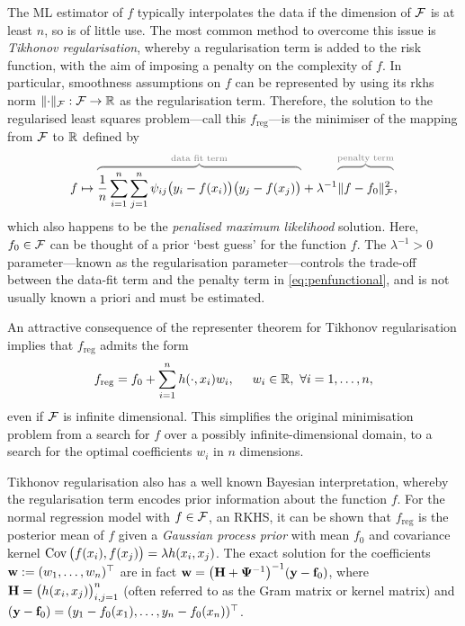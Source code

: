 \documentclass[11pt,twoside,openright,showframe]{report}
\begin{document}
The ML estimator of $f$ typically interpolates the data if the dimension of ${\mathcal F}$ is at least $n$, so is of little use.
The most common method to overcome this issue is \emph{Tikhonov regularisation}, whereby a regularisation term is added to the risk function, with the aim of imposing a penalty on the complexity of $f$. 
In particular, smoothness assumptions on $f$ can be represented by using its \gls{rkhs} norm $\lVert\cdot\rVert_{\mathcal F}:{\mathcal F} \to \mathbb{R}$ as the regularisation term\footnotemark. 
Therefore, the solution to the regularised least squares problem---call this $f_{\text{reg}}$---is the minimiser of the mapping from ${\mathcal F}$ to $\mathbb{R}$ defined by
\begin{equation}\label{eq:penfunctional}
  f \mapsto 
  \myoverbrace{\frac{1}{n}\sum_{i=1}^n \sum_{j=1}^n \psi_{ij} \big( y_i - f(x_i) \big) \big( y_j - f(x_j) \big)}{\text{data fit term}}
  + \lambda^{-1} 
  \myoverbrace{\vphantom{\sum_{i=1}^n} \norm{f-f_0}^2_\cF}{\text{penalty term}}
  ,
\end{equation}
which also happens to be the \emph{penalised maximum likelihood} solution. 
Here, $f_0 \in {\mathcal F}$ can be thought of a prior `best guess' for the function $f$.
The $\lambda^{-1} > 0$ parameter---known as the regularisation parameter---controls the trade-off between the data-fit term and the penalty term in \cref{eq:penfunctional}, and is not usually known a priori and must be estimated.

An attractive consequence of the representer theorem \citep{kimeldorf1970correspondence} for Tikhonov regularisation implies that $f_\text{reg}$ admits the form
\begin{align}\label{eq:repform}
  f_\text{reg} = f_0 + \sum_{i=1}^n h(\cdot,x_i)w_i, \hspace{0.5cm} w_i \in \mathbb{R}, \ \forall i=1,\dots,n, 
\end{align}
even if ${\mathcal F}$ is infinite dimensional.
This simplifies the original minimisation problem from a search for $f$ over a possibly infinite-dimensional domain, to a search for the optimal coefficients $w_i$ in $n$ dimensions.


Tikhonov regularisation also has a well known Bayesian interpretation, whereby the regularisation term encodes prior information about the function $f$. 
For the normal regression model with $f \in {\mathcal F}$, an RKHS, it can be shown that $f_{\text{reg}}$ is the posterior mean of $f$ given a \emph{Gaussian process prior} \citep{rasmussen2006gaussian} with mean $f_0$ and covariance kernel $\operatorname{Cov}\big(f(x_i),f(x_j)\big) = \lambda h(x_i, x_j)$. 
The exact solution for the coefficients ${\mathbf w} := (w_1,\dots,w_n)^\top$ are in fact ${\mathbf w} = \big({\mathbf H} + {\bm\Psi}^{-1}\big)^{-1}({\mathbf y} - {\mathbf f}_0)$, where ${\mathbf H} = \big(h(x_i,x_j) \big)_{i,j=1}^n$ (often referred to as the Gram matrix or kernel matrix) and $({\mathbf y} - {\mathbf f}_0) = (y_1 - f_0(x_1), \dots, y_n - f_0(x_n))^\top$.
\end{document}
